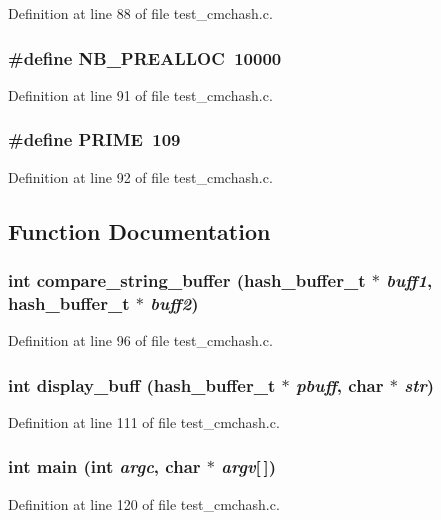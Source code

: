 Definition at line 88 of file test\_\-cmchash.c.
\subsubsection[{NB\_\-PREALLOC}]{\setlength{\rightskip}{0pt plus 5cm}\#define NB\_\-PREALLOC~10000}\label{test__cmchash_8c_a86ddf7c36b9a7e599bb04786c61b0370}


Definition at line 91 of file test\_\-cmchash.c.
\subsubsection[{PRIME}]{\setlength{\rightskip}{0pt plus 5cm}\#define PRIME~109}\label{test__cmchash_8c_ac4add2a227a10511e0128d63952030e8}


Definition at line 92 of file test\_\-cmchash.c.

\subsection{Function Documentation}
\subsubsection[{compare\_\-string\_\-buffer}]{\setlength{\rightskip}{0pt plus 5cm}int compare\_\-string\_\-buffer (hash\_\-buffer\_\-t $\ast$ {\em buff1}, \/  hash\_\-buffer\_\-t $\ast$ {\em buff2})}\label{test__cmchash_8c_af183d0c5e0c482d0f02845db8a2f785c}


Definition at line 96 of file test\_\-cmchash.c.
\subsubsection[{display\_\-buff}]{\setlength{\rightskip}{0pt plus 5cm}int display\_\-buff (hash\_\-buffer\_\-t $\ast$ {\em pbuff}, \/  char $\ast$ {\em str})}\label{test__cmchash_8c_ad9a0e7d500dc83e14095e7c90c40c5b9}


Definition at line 111 of file test\_\-cmchash.c.
\subsubsection[{main}]{\setlength{\rightskip}{0pt plus 5cm}int main (int {\em argc}, \/  char $\ast$ {\em argv}[$\,$])}\label{test__cmchash_8c_a0ddf1224851353fc92bfbff6f499fa97}


Definition at line 120 of file test\_\-cmchash.c.
